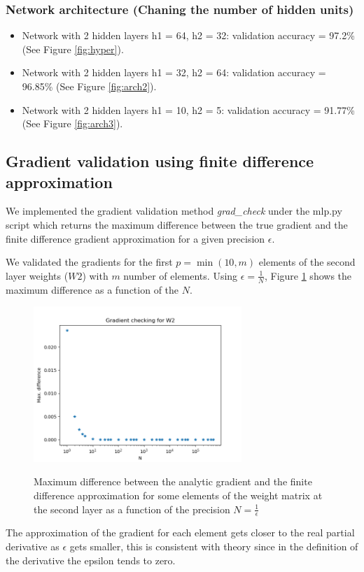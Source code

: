 \documentclass[a4paper]{article}
\begin{document}
\begin{enumerate}
\subsubsection{Network architecture (Chaning the number of hidden units)}


\begin{itemize}

\item Network with 2 hidden layers h1 = 64, h2 = 32: validation accuracy = 97.2\% (See Figure \ref{fig:hyper}).

\item Network with 2 hidden layers h1 = 32, h2 = 64: validation accuracy = 96.85\% (See Figure \ref{fig:arch2}).

\item Network with 2 hidden layers h1 = 10, h2 = 5: validation accuracy = 91.77\% (See Figure \ref{fig:arch3}).

\end{itemize}


\subsection{Gradient validation using finite difference approximation}
We implemented the gradient validation method \emph{grad\_check} under the mlp.py script which returns the maximum difference between the true gradient and the finite difference gradient approximation for a given precision $\epsilon$.

We validated the gradients for the first $p=\min(10,m)$ elements of the second layer weights ($W2$) with $m$ number of elements. Using $\epsilon=\frac{1}{N}$, Figure \ref{fig:grad_check} shows the maximum difference as a function of the $N$.

\begin{figure}
\centering
\includegraphics[width=0.7\textwidth]{grad_check}
\label{fig:grad_check}
\caption{Maximum difference between the analytic gradient and the finite difference approximation for some elements of the weight matrix at the second layer as a function of the precision $N = \frac{1}{\epsilon}$}
\end{figure}

The approximation of the gradient for each element gets closer to the real partial derivative as $\epsilon$ gets smaller, this is consistent with theory since in the definition of the derivative the epsilon tends to zero. 

\end{enumerate}
\end{document}
